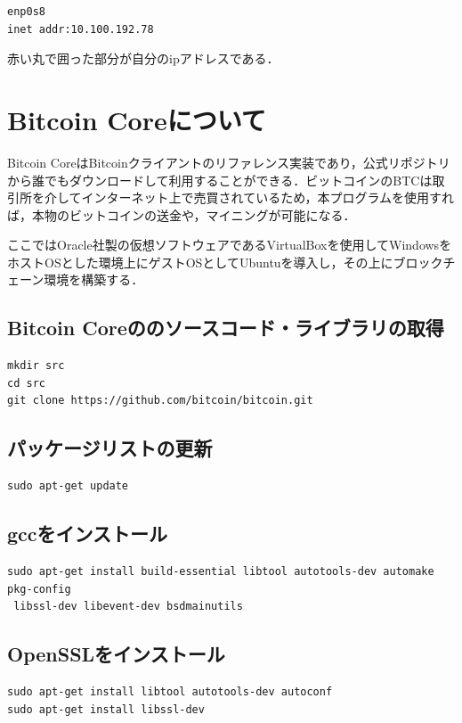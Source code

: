 \begin{verbatim}
enp0s8
inet addr:10.100.192.78
\end{verbatim}

赤い丸で囲った部分が自分のipアドレスである．

\newpage




\section{Bitcoin Coreについて}

Bitcoin CoreはBitcoinクライアントのリファレンス実装であり，公式リポジトリから誰でもダウンロードして利用することができる．ビットコインのBTCは取引所を介してインターネット上で売買されているため，本プログラムを使用すれば，本物のビットコインの送金や，マイニングが可能になる\cite{b}．


ここではOracle社製の仮想ソフトウェアであるVirtualBoxを使用してWindowsをホストOSとした環境上にゲストOSとしてUbuntuを導入し，その上にブロックチェーン環境を構築する．


\subsection{Bitcoin Coreののソースコード・ライブラリの取得}

\begin{verbatim}
mkdir src
cd src
git clone https://github.com/bitcoin/bitcoin.git
\end{verbatim}


\subsection{パッケージリストの更新}

\begin{verbatim}
sudo apt-get update
\end{verbatim}


\newpage


\subsection{gccをインストール}

\begin{verbatim}
sudo apt-get install build-essential libtool autotools-dev automake pkg-config 
 libssl-dev libevent-dev bsdmainutils
\end{verbatim}


\subsection{OpenSSLをインストール}
\begin{verbatim}
sudo apt-get install libtool autotools-dev autoconf
sudo apt-get install libssl-dev
\end{verbatim}


